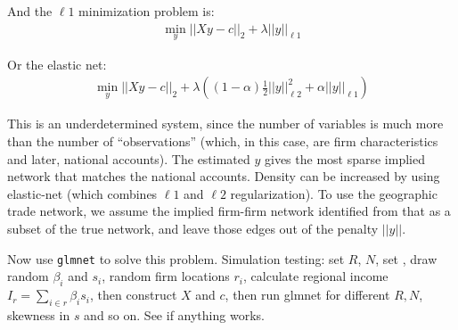 \documentclass[11pt]{article}
\begin{document}

And the $\ell 1$ minimization problem is:
\begin{gather}
\min_y || X y - c||_2 + \lambda || y ||_{\ell 1}
\end{gather}

Or the elastic net:
\begin{gather}
\min_y || X y - c||_2 + \lambda \left( (1-\alpha) \frac{1}{2} || y ||^2_{\ell 2} + \alpha || y ||_{\ell 1} \right)
\end{gather}


This is an underdetermined system, since the number of variables is much more than the number of ``observations'' (which, in this case, are firm characteristics and later, national accounts). The estimated $y$ gives the most sparse implied network that matches the national accounts. Density can be increased by using elastic-net (which combines $\ell 1$ and $\ell 2$ regularization).  To use the geographic trade network, we assume the implied firm-firm network identified from that as a subset of the true network, and leave those edges out of the penalty $||y||$.

Now use \texttt{glmnet} to solve this problem. Simulation testing: set $R$, $N$, set , draw random $\beta_i$ and $s_i$, random firm locations $r_i$, calculate regional income $I_r = \sum_{i \in r} \beta_i s_i$, then construct $X$ and $c$, then run glmnet for different $R,N$, skewness in $s$ and so on. See if anything works.
\end{document}
